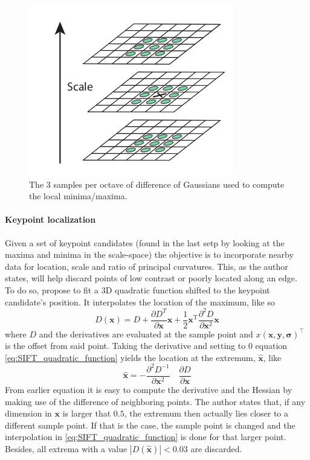 \documentclass[../main.tex]{subfiles}
\begin{document}
\begin{figure}[htbp]
    \centering
    \includegraphics[width=0.4\linewidth]{images/DOG_maxmin_SIFT.png}
    \caption{The 3 samples per octave of difference of Gaussians used to compute the local minima/maxima.}
    \label{fig:DOG_maxmin_SIFT}
\end{figure}

\paragraph{Keypoint localization}
Given a set of keypoint candidates (found in the last setp by looking at the maxima and minima in the scale-space) the objective is to incorporate nearby data for location, scale and ratio of principal curvatures. This, as the author states, will help discard points of low contrast or poorly located along an edge. To do so, \cite{SIFT_Brown_Lowe} propose to fit a 3D quadratic function shifted to the keypoint candidate's position. It interpolates the location of the maximum, like so
\begin{equation} \label{eq:SIFT_quadratic_function}
    D(\mathbf{x})=D+\frac{\partial D^{T}}{\partial \mathbf{x}} \mathbf{x}+\frac{1}{2} \mathbf{x}^{\mathrm{T}} \frac{\partial^{2} D}{\partial \mathbf{x}^{2}} \mathbf{x}
\end{equation}
where $D$ and the derivatives are evaluated at the sample point and $x\left(\mathbf{x}, \mathbf{y}, \mathbf{\sigma}\right)^{\top}$ is the offset from said point. Taking the derivative and setting to 0 equation \ref{eq:SIFT_quadratic_function} yields the location at the extremum, $\hat{\mathbf{x}}$, like
\begin{equation} \label{eq:SIFT_quadratic_function_extremum}
    \hat{\mathbf{x}}=-\frac{\partial^{2} D^{-1}}{\partial \mathbf{x}^{2}} \quad \frac{\partial D}{\partial \mathbf{x}}
\end{equation}
From earlier equation it is easy to compute the derivative and the Hessian by making use of the difference of neighboring points. The author states that, if any dimension in $\mathbf{x}$ is larger that $0.5$, the extremum then actually lies closer to a different sample point. If that is the case, the sample point is changed and the interpolation in \ref{eq:SIFT_quadratic_function} is done for that larger point. Besides, all extrema with a value $|D(\hat{\mathbf{x}})| < 0.03$ are discarded.
\end{document}
